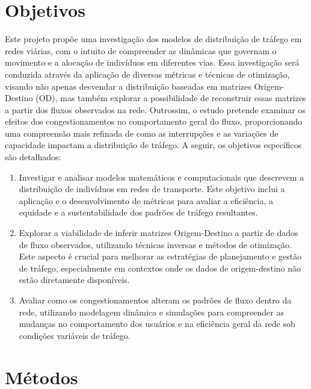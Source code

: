 \documentclass{article}
\begin{document}

\newpage
\section{Objetivos}

Este projeto propõe uma investigação dos modelos de distribuição de tráfego em redes viárias, com o intuito de compreender as dinâmicas que governam o movimento e a alocação de indivíduos em diferentes vias. Essa investigação será conduzida através da aplicação de diversas métricas e técnicas de otimização, visando não apenas desvendar a distribuição baseadas em matrizes Origem-Destino (OD), mas também explorar a possibilidade de reconstruir essas matrizes a partir dos fluxos observados na rede. Outrossim, o estudo pretende examinar os efeitos dos congestionamentos no comportamento geral do fluxo, proporcionando uma compreensão mais refinada de como as interrupções e as variações de capacidade impactam a distribuição de tráfego. A seguir, os objetivos específicos são detalhados:

\begin{enumerate}
    \item Investigar e analisar modelos matemáticos e computacionais que descrevem a distribuição de indivíduos em redes de transporte. Este objetivo inclui a aplicação e o desenvolvimento de métricas para avaliar a eficiência, a equidade e a sustentabilidade dos padrões de tráfego resultantes.
    \item Explorar a viabilidade de inferir matrizes Origem-Destino a partir de dados de fluxo observados, utilizando técnicas inversas e métodos de otimização. Este aspecto é crucial para melhorar as estratégias de planejamento e gestão de tráfego, especialmente em contextos onde os dados de origem-destino não estão diretamente disponíveis.
    \item Avaliar como os congestionamentos alteram os padrões de fluxo dentro da rede, utilizando modelagem dinâmica e simulações para compreender as mudanças no comportamento dos usuários e na eficiência geral da rede sob condições variáveis de tráfego.
\end{enumerate}


\newpage

\section{Métodos}
\end{document}
